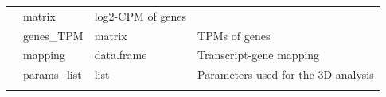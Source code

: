\documentclass[]{article}
\begin{document}
\begin{longtable}[]{@{}llll@{}}
\begin{minipage}[t]{0.06\columnwidth}
\end{minipage} & \begin{minipage}[t]{0.04\columnwidth}\raggedright\strut
matrix\strut
\end{minipage} & \begin{minipage}[t]{0.71\columnwidth}\raggedright\strut
log2-CPM of genes\strut
\end{minipage}\tabularnewline
\begin{minipage}[t]{0.08\columnwidth}\raggedright\strut
\strut
\end{minipage} & \begin{minipage}[t]{0.06\columnwidth}\raggedright\strut
genes\_TPM\strut
\end{minipage} & \begin{minipage}[t]{0.04\columnwidth}\raggedright\strut
matrix\strut
\end{minipage} & \begin{minipage}[t]{0.71\columnwidth}\raggedright\strut
TPMs of genes\strut
\end{minipage}\tabularnewline
\begin{minipage}[t]{0.08\columnwidth}\raggedright\strut
\strut
\end{minipage} & \begin{minipage}[t]{0.06\columnwidth}\raggedright\strut
mapping\strut
\end{minipage} & \begin{minipage}[t]{0.04\columnwidth}\raggedright\strut
data.frame\strut
\end{minipage} & \begin{minipage}[t]{0.71\columnwidth}\raggedright\strut
Transcript-gene mapping\strut
\end{minipage}\tabularnewline
\begin{minipage}[t]{0.08\columnwidth}\raggedright\strut
\strut
\end{minipage} & \begin{minipage}[t]{0.06\columnwidth}\raggedright\strut
params\_list\strut
\end{minipage} & \begin{minipage}[t]{0.04\columnwidth}\raggedright\strut
list\strut
\end{minipage} & \begin{minipage}[t]{0.71\columnwidth}\raggedright\strut
Parameters used for the 3D analysis\strut
\end{minipage}\tabularnewline
\begin{minipage}[t]{0.08\columnwidth}\raggedright\strut
\strut
\end{minipage} & \begin{minipage}[t]{0.06\columnwidth}\raggedright\strut

\end{minipage}
\end{longtable}
\end{document}

